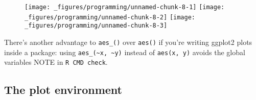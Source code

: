 \begin{Shaded}
\begin{Highlighting}[]
\StringTok{ }
  \NormalTok{(~}\NormalTok{(}\NormalTok{), } 
\NormalTok{\}}
\NormalTok{) +}\StringTok{ }\NormalTok{(} \NormalTok{)}

\StringTok{ }
  \NormalTok{(~}\NormalTok{(}\NormalTok{), } 
\NormalTok{\}}
\StringTok{ }\NormalTok{(} \NormalTok{)}

\StringTok{ }
  \NormalTok{(~}\NormalTok{(}\NormalTok{), } 
\NormalTok{\}}
\StringTok{ }\NormalTok{(} \NormalTok{)}
\end{Highlighting}
\end{Shaded}

\begin{figure}[H]
  \texttt{[image: \_figures/programming/unnamed-chunk-8-1]}%
  \texttt{[image: \_figures/programming/unnamed-chunk-8-2]}%
  \texttt{[image: \_figures/programming/unnamed-chunk-8-3]}
\end{figure}

There's another advantage to \texttt{aes\_()} over \texttt{aes()} if
you're writing ggplot2 plots inside a package: using
\texttt{aes\_(\textasciitilde{}x,\ \textasciitilde{}y)} instead of
\texttt{aes(x,\ y)} avoids the global variables NOTE in
\texttt{R\ CMD\ check}. 

\subsection{The plot environment}

